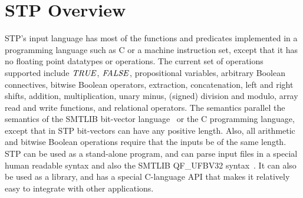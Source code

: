 \section{STP Overview}


STP's input language has most of the functions and predicates
implemented in a programming language such as C or a machine
instruction set, except that it has no floating point datatypes or
operations. The current set of operations supported include
${\it TRUE}$, ${\it FALSE}$, propositional variables, arbitrary Boolean
connectives, bitwise Boolean operators, extraction, concatenation,
left and right shifts, addition, multiplication, unary minus, (signed)
division and modulo, array read and write functions, and relational
operators. The semantics parallel the semantics of the SMTLIB
bit-vector language~\cite{smtlib} or the C programming language, except
that in STP bit-vectors can have any positive length. Also, all
arithmetic and bitwise Boolean operations require that the inputs be
of the same length. STP can be used as a stand-alone program, and can
parse input files in a special human readable syntax and also the
SMTLIB QF\_UFBV32 syntax~\cite{smtlib}. It can also be used as a
library, and has a special C-language API that makes it relatively
easy to integrate with other applications.







